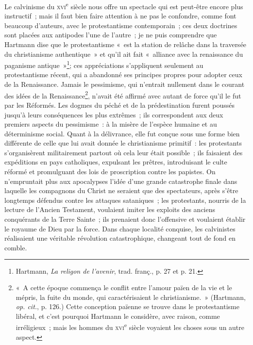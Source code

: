 \documentclass[french,twoside]{book} %
\begin{document}
Le calvinisme du {\scshape xvi}\textsuperscript{e} siècle nous offre un spectacle qui est peut-être encore plus instructif ; mais il faut bien  faire attention à ne pas le confondre, comme font beaucoup d’auteurs, avec le protestantisme contemporain ; ces deux doctrines sont placées aux antipodes l’une de l’autre ; je ne puis comprendre que Hartmann dise que le protestantisme « est la station de relâche dans la traversée du christianisme authentique » et qu’il ait fait « alliance avec la renaissance du paganisme antique »\footnote{ \noindent Hartmann, \emph{La religon de l’avenir}, trad. franç., p. 27 et p. 21.
 }; ces appréciations s’appliquent seulement au protestantisme récent, qui a abandonné ses principes propres pour adopter ceux de la Renaissance. Jamais le pessimisme, qui n’entrait nullement dans le courant des idées de la Renaissance\footnote{ \noindent « A cette époque commença le conflit entre l’amour païen de la vie et le mépris, la fuite du monde, qui caractérisaient le christianisme. » (Hartmann, \emph{op. cit.}, p. 126.) Cette conception païenne se trouve dans le protestantisme libéral, et c’est pourquoi Hartmann le considère, avec raison, comme irréligieux ; mais les hommes du {\scshape xvi}\textsuperscript{e} siècle voyaient les choses sous un autre aspect.
 }, n’avait été affirmé avec autant de force qu’il le fut par les Réformés. Les dogmes du péché et de la prédestination furent poussés jusqu’à leurs conséquences les plus extrêmes ; ils correspondent aux deux premiers aspects du pessimisme : à la misère de l’espèce humaine et au déterminisme social. Quant à la délivrance, elle fut conçue sous une forme bien différente de celle que lui avait donnée le christianisme primitif : les protestants s’organisèrent militairement partout où cela leur était possible ; ils faisaient des expéditions en pays  catholiques, expulsant les prêtres, introduisant le culte réformé et promulguant des lois de proscription contre les papistes. On n’empruntait plus aux apocalypses l’idée d’une grande catastrophe finale dans laquelle les compagnons du Christ ne seraient que des spectateurs, après s’être longtemps défendus contre les attaques sataniques ; les protestants, nourris de la lecture de l’Ancien Testament, voulaient imiter les exploits des anciens conquérants de la Terre Sainte ; ils prenaient donc l’offensive et voulaient établir le royaume de Dieu par la force. Dans chaque localité conquise, les calvinistes réalisaient une véritable révolution catastrophique, changeant tout de fond en comble.\par
\end{document}

